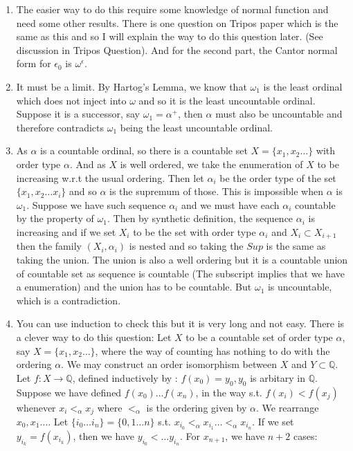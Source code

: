 \begin{enumerate}
\item The easier way to do this require some knowledge of normal function and need some other results. There is one question on Tripos paper which is the same as this and so I will explain the way to do this question later. (See discussion in Tripos Question). And for the second part, the Cantor normal form for $\epsilon_0$ is $\omega^\epsilon$.\\
\item It must be a limit. By Hartog's Lemma, we know that $\omega_1$ is the least ordinal which does not inject into $\omega$ and so it is the least uncountable ordinal. Suppose it is a successor, say $\omega_1 = \alpha^+$, then $\alpha$ must also be uncountable and therefore contradicts $\omega_1$ being the least uncountable ordinal.\\
\item As $\alpha$ is a countable ordinal, so there is a countable set $X=\{x_1,x_2 \ldots\}$ with order type $\alpha$. And as $X$ is well ordered, we take the enumeration of $X$ to be increasing w.r.t the usual ordering. Then let $\alpha_i$ be the order type of the set $\{x_1,x_2 \ldots x_i\}$ and so $\alpha$ is the supremum of those. This is impossible when $\alpha$ is $\omega_1$. Suppose we have such sequence $\alpha_i$ and we must have each $\alpha_i$ countable by the property of $\omega_1$. Then by synthetic definition, the sequence $\alpha_i$ is increasing and if we set $X_i$ to be the set with order type $\alpha_i$ and $X_i \subset X_{i+1}$ then the family $(X_i, \alpha_i)$ is nested and so taking the $Sup$ is the same as taking the union. The union is also a well ordering but it is a countable union of countable set as sequence is countable (The subscript implies that we have a enumeration) and the union has to be countable. But $\omega_1$ is uncountable, which is a contradiction.\\
\item You can use induction to check this but it is very long and not easy. There is a clever way to do this question: Let $X$ to be a countable set of order type $\alpha$, say $X=\{x_1,x_2 \ldots\}$, where the way of counting has nothing to do with the ordering $\alpha$. We may construct an order isomorphism between $X$ and $Y \subset \mathbb{Q}$. Let $f: X \rightarrow \mathbb{Q}$, defined inductively by : $f(x_0)=y_0, y_0$ is arbitary in $\mathbb{Q}$.\\
    Suppose we have defined $f(x_0) \ldots f(x_n)$, in the way s.t. $f(x_i) < f(x_j)$ whenever $x_i <_\alpha x_j$ where $<_\alpha$ is the ordering given by $\alpha$. We rearrange $x_0, x_1 \ldots$. Let $\{i_0 \ldots i_n\}=\{0,1 \ldots n\}$ s.t. $x_{i_0} <_\alpha x_{i_1} \ldots <_\alpha x_{i_n}$. If we set $y_{i_k}=f(x_{i_k})$, then we have $y_{i_0} < \ldots y_{i_n}$. For $x_{n+1}$, we have $n+2$ cases:

\end{enumerate}

